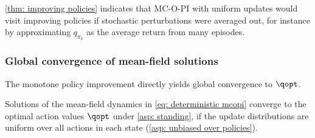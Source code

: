 \autoref{thm: improving policies} indicates that 
MC-O-PI with uniform updates would visit improving policies
if stochastic perturbations were averaged out, for instance by approximating $q_{\pi_k}$ as the average return from many episodes.









































\subsubsection{Global convergence of mean-field solutions}

The monotone policy improvement directly yields global convergence to $\qopt$.

\begin{proposition}
\label{thm: convergence deterministic mcopi}
    Solutions of the mean-field dynamics in \eqref{eq: deterministic mcopi} converge to the optimal action values $\qopt$
    under \autoref{asp: standing},
    if the update distributions are uniform over all actions in each state (\autoref{asp: unbiased over policies}).
\end{proposition}

